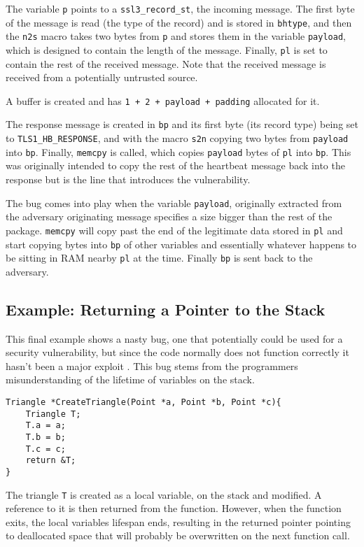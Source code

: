 The variable \verb!p! points to a \verb!ssl3_record_st!, the incoming message.
The first byte of the message is read (the type of the record) and is stored in \verb!bhtype!, and then the \verb!n2s! macro takes two bytes from \verb!p! and stores them in the variable \verb!payload!, which is designed to contain the length of the message.
Finally, \verb!pl! is set to contain the rest of the received message.
Note that the received message is received from a potentially untrusted source.

A buffer is created and has \verb!1 + 2 + payload + padding! allocated for it.

The response message is created in \verb!bp! and its first byte (its record type) being set to \verb!TLS1_HB_RESPONSE!, and with the macro \verb!s2n! copying two bytes from \verb!payload! into \verb!bp!.
Finally, \verb!memcpy! is called, which copies \verb!payload! bytes of \verb!pl! into \verb!bp!.
This was originally intended to copy the rest of the heartbeat message back into the response but is the line that introduces the vulnerability.

The bug comes into play when the variable \verb!payload!, originally extracted from the adversary originating message specifies a size bigger than the rest of the package.
\verb!memcpy! will copy past the end of the legitimate data stored in \verb!pl! and start copying bytes into \verb!bp! of other variables and essentially whatever happens to be sitting in RAM nearby \verb!pl! at the time.
Finally \verb!bp! is sent back to the adversary.


\subsection{Example: Returning a Pointer to the Stack}
This final example shows a nasty bug, one that potentially could be used for a security vulnerability, but since the code normally does not function correctly it hasn't been a major exploit \cite{returnLocal}.
This bug stems from the programmers misunderstanding of the lifetime of variables on the stack.

\begin{verbatim}
Triangle *CreateTriangle(Point *a, Point *b, Point *c){
    Triangle T;
    T.a = a;
	T.b = b;
    T.c = c;
    return &T;
}
\end{verbatim}

The triangle \verb!T! is created as a local variable, on the stack and modified.
A reference to it is then returned from the function.
However, when the function exits, the local variables lifespan ends, resulting in the returned pointer pointing to deallocated space that will probably be overwritten on the next function call.

